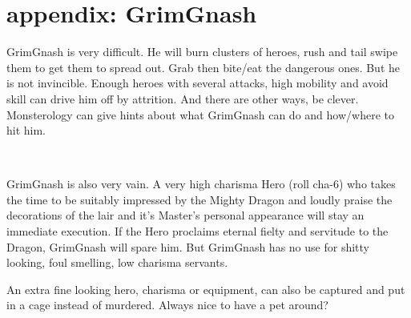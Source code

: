 































\clearpage
\section*{appendix: GrimGnash}
\label{appendixgrimgnash}

\raggedbottom

GrimGnash is very difficult. He will burn clusters of heroes, rush and tail swipe them to get them to spread out. Grab then bite/eat the dangerous ones. But he is not invincible. Enough heroes with several attacks, high mobility and avoid skill can drive him off by attrition. And there are other ways, be clever. Monsterology can give hints about what GrimGnash can do and how/where to hit him.

\

GrimGnash is also very vain. A very high charisma Hero (roll cha-6) who takes the time to be suitably impressed by the Mighty Dragon and loudly praise the decorations of the lair and it's Master's personal appearance will stay an immediate execution. If the Hero proclaims eternal fielty and servitude to the Dragon, GrimGnash will spare him. But GrimGnash has no use for shitty looking, foul smelling, low charisma servants.

An extra fine looking hero, charisma or equipment, can also be captured and put in a cage instead of murdered. Always nice to have a pet around?

\

